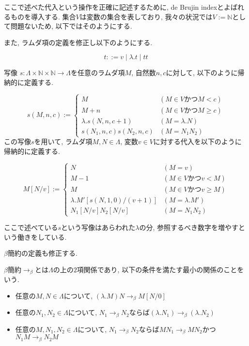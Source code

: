 \documentclass[12pt, titlepage]{ltjsarticle}
\begin{document}
ここで述べた代入という操作を正確に記述するために, de Brujin indexとよばれるものを導入する.
集合$V$は変数の集合を表しており, 我々の状況では$V := \mathbb{N}$として問題ないため, 以下ではそのようにする.

また, ラムダ項の定義を修正し以下のようにする.

\begin{defn}
 \[
 t ::= v \mid \lambda. t \mid t t
 \]
\end{defn}

\begin{defn}
 写像 $s \colon \Lambda \times \mathbb{N} \times \mathbb{N} \rightarrow \Lambda$を任意のラムダ項$M$, 自然数$n, c$に対して, 以下のように帰納的に定義する.
 
\[
  s (M, n, c) := \begin{cases}
    M & (M \in V \text{かつ} M < c) \\
    M + n & (M \in V \text{かつ} M \geq c) \\
    \lambda. s (N, n, c + 1) & (M = \lambda. N) \\
    s (N_1, n, c) s (N_2, n, c) & (M = N_1 N_2)
  \end{cases}
\]
 この写像$s$を用いて, ラムダ項$M, N \in \Lambda$, 変数$v \in V$に対する代入を以下のように帰納的に定義する.
 
\[
 M[N/v] := \begin{cases}
    N & (M = v) \\
    M - 1 & (M \in V \text{かつ} v < M) \\
    M & (M \in V \text{かつ} v \geq M) \\
    \lambda. M' [s (N, 1, 0)/(v + 1)] & (M = \lambda. M') \\
    N_1[N/v] N_2[N/v] & (M = N_1 N_2)
  \end{cases}
\]
\end{defn}

ここで述べている$s$という写像はあらわれた$\lambda$の分, 参照するべき数字を増やすという働きをしている.

$\beta$簡約の定義も修正する.

\begin{defn}
 $\beta$簡約$\rightarrow_{\beta}$とは$\Lambda$の上の$2$項関係であり, 以下の条件を満たす最小の関係のことをいう.
 \begin{itemize}
  \item 任意の$M, N \in \Lambda$について, $(\lambda. M) N \rightarrow_\beta M[N/0]$
  \item 任意の$N_1, N_2 \in \Lambda$について, $N_1 \rightarrow_\beta N_2$ならば$(\lambda. N_1) \rightarrow_\beta (\lambda. N_2)$
  \item 任意の$M, N_1, N_2 \in \Lambda$について, $N_1 \rightarrow_\beta N_2$ならば$M N_1 \rightarrow_\beta M N_2$かつ$N_1 M \rightarrow_\beta N_2 M$
 \end{itemize}
\end{defn}
\end{document}
